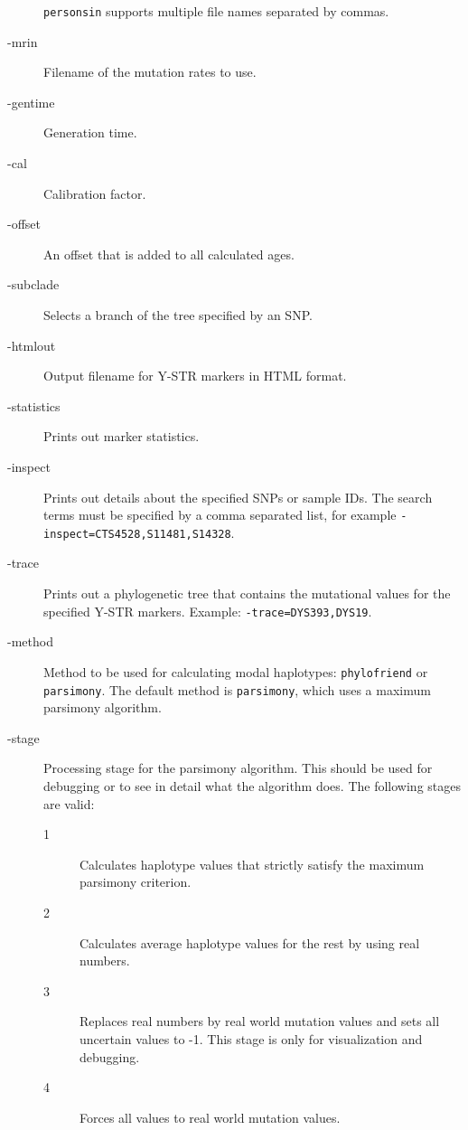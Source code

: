\begin{description}
	\texttt{personsin} supports multiple file names separated by
	commas.
\item[-mrin] Filename of the mutation rates to use.
\item[-gentime] Generation time.
\item[-cal] Calibration factor.
\item[-offset] An offset that is added to all calculated ages.
\item[-subclade] Selects a branch of the tree specified by an SNP.
\item[-htmlout] Output filename for Y-STR markers in HTML format.
\item[-statistics] Prints out marker statistics.
\item[-inspect] Prints out details about the specified SNPs or
	sample IDs. The search terms must be specified by a comma
	separated list, for example \texttt{-inspect=CTS4528,S11481,S14328}.
\item[-trace] Prints out a phylogenetic tree that contains the
	mutational values for the specified Y-STR markers. Example:
	\texttt{-trace=DYS393,DYS19}.
\item[-method] Method to be used for calculating modal haplotypes:
	\texttt{phylofriend} or \texttt{parsimony}. The default method
	is \texttt{parsimony}, which uses a maximum parsimony algorithm.
\item[-stage] Processing stage for the parsimony algorithm. This
	should be used for debugging or to see in detail what the algorithm
	does. The following stages are valid:
	\begin{description}
	\item[1] Calculates haplotype values that strictly satisfy
		the maximum parsimony criterion.
	\item[2] Calculates average haplotype values for the rest
		by using real numbers.
	\item[3] Replaces real numbers by real world mutation values
		and sets all uncertain values to -1.
		This stage is only for visualization and debugging.
	\item[4] Forces all values to real world mutation values.
	\end{description}
\end{description}

